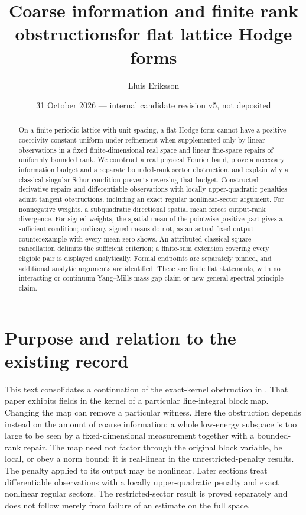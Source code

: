 \documentclass[11pt]{article}
\title{Coarse information and finite rank obstructions\newline for flat lattice Hodge forms}
\author{Lluis Eriksson}
\date{31 October 2026 --- internal candidate revision v5, not deposited}
\begin{document}
\maketitle
\begin{abstract}
On a finite periodic lattice with unit spacing, a flat Hodge form cannot
have a positive coercivity constant uniform under refinement when supplemented
only by linear observations in a fixed finite-dimensional real space and
linear fine-space repairs of uniformly bounded rank. We construct a real
physical Fourier band, prove a necessary information budget and a separate
bounded-rank sector obstruction, and explain why a classical singular-Schur
condition prevents reversing that budget. Constructed derivative repairs
and differentiable observations with locally upper-quadratic penalties
admit tangent obstructions, including an exact regular nonlinear-sector
argument. For nonnegative weights, a subquadratic directional spatial mean
forces output-rank divergence. For signed weights, the spatial mean of the
pointwise positive part gives a sufficient condition; ordinary signed means
do not, as an actual fixed-output counterexample with every mean zero shows.
An attributed classical square cancellation delimits the sufficient criterion;
a finite-sum extension covering every eligible pair is displayed analytically.
Formal endpoints are separately pinned, and additional analytic arguments
are identified. These are finite flat statements, with no interacting or
continuum Yang--Mills mass-gap claim or new general spectral-principle claim.
\end{abstract}

\section{Purpose and relation to the existing record}
This text consolidates a continuation of the exact-kernel obstruction in
\cite{eriksson}. That paper exhibits fields in the kernel of a particular
line-integral block map. Changing the map can remove a particular witness.
Here the obstruction depends instead on the amount of coarse information:
a whole low-energy subspace is too large to be seen by a fixed-dimensional
measurement together with a bounded-rank repair. The map need not factor
through the original block variable, be local, or obey a norm bound; it is
real-linear in the unrestricted-penalty results. The penalty applied to its output may be nonlinear. Later sections treat differentiable observations with a locally upper-quadratic penalty and exact nonlinear regular sectors.
The restricted-sector result is proved separately and does not follow merely
from failure of an estimate on the full space.
\end{document}
